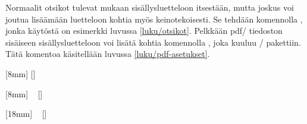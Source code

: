Normaalit otsikot tulevat mukaan sisällysluetteloon itsestään, mutta
joskus voi joutua lisäämään luetteloon kohtia myös keinotekoisesti. Se
tehdään komennolla , jonka käytöstä on
esimerkki luvussa \ref{luku/otsikot}. Pelkkään pdf\-/ tiedoston
sisäiseen sisällysluetteloon voi lisätä kohtia komennolla
, joka kuuluu \-/ pakettiin.
Tätä komentoa käsitellään luvussa \ref{luku/pdf-asetukset}.

\begin{esimerkki*}

\begin{koodilohko}
[8mm]                                       %
{\addvspace{1.5ex}\rmfamily\bfseries\large} %
{\contentslabel{8mm}}                       %
{\hspace{-8mm}}                             %
{\small\titlerule[0bp]\contentspage}  %
[\addvspace{.5ex}]                    %

[8mm]                                       %
{\addvspace{.5ex}\rmfamily\normalsize}      %
{\contentslabel{8mm}}                       %
{}                                          %
{~\small{}\contentspage}   %
[\addvspace{.2ex}]                          %

[18mm]                                      %
{\rmfamily\small}                           %
{\contentslabel{10mm}}                      %
{}                                          %
{~\small{}\contentspage}   %
[]                                          %
\end{koodilohko}
  \caption{Sisällysluettelon ulkoasua muokataan \-/
    komennolla, joka on peräisin \-/ paketista}
  \label{esim/titlecontents}
\end{esimerkki*}

